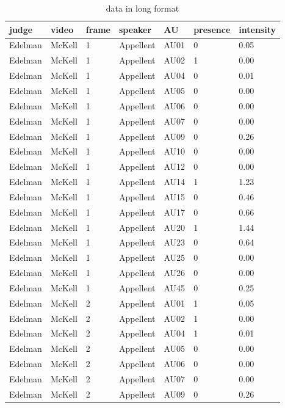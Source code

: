 \documentclass{monashthesis}
\begin{document}
\begin{table}[ht]
\begin{center}
\caption{\label{tab:long} data in long format}
\begin{tabular}{lllllll}
\toprule
judge & video & frame & speaker & AU & presence & intensity \\
\midrule
Edelman & McKell & 1 & Appellent & AU01 & 0 & 0.05 \\
Edelman & McKell & 1 & Appellent & AU02 & 1 & 0.00 \\
Edelman & McKell & 1 & Appellent & AU04 & 0 & 0.01 \\
Edelman & McKell & 1 & Appellent & AU05 & 0 & 0.00 \\
Edelman & McKell & 1 & Appellent & AU06 & 0 & 0.00 \\
Edelman & McKell & 1 & Appellent & AU07 & 0 & 0.00 \\
Edelman & McKell & 1 & Appellent & AU09 & 0 & 0.26 \\
Edelman & McKell & 1 & Appellent & AU10 & 0 & 0.00 \\
Edelman & McKell & 1 & Appellent & AU12 & 0 & 0.00 \\
Edelman & McKell & 1 & Appellent & AU14 & 1 & 1.23 \\
Edelman & McKell & 1 & Appellent & AU15 & 0 & 0.46 \\
Edelman & McKell & 1 & Appellent & AU17 & 0 & 0.66 \\
Edelman & McKell & 1 & Appellent & AU20 & 1 & 1.44 \\
Edelman & McKell & 1 & Appellent & AU23 & 0 & 0.64 \\
Edelman & McKell & 1 & Appellent & AU25 & 0 & 0.00 \\
Edelman & McKell & 1 & Appellent & AU26 & 0 & 0.00 \\
Edelman & McKell & 1 & Appellent & AU45 & 0 & 0.25 \\
Edelman & McKell & 2 & Appellent & AU01 & 1 & 0.05 \\
Edelman & McKell & 2 & Appellent & AU02 & 1 & 0.00 \\
Edelman & McKell & 2 & Appellent & AU04 & 1 & 0.01 \\
Edelman & McKell & 2 & Appellent & AU05 & 0 & 0.00 \\
Edelman & McKell & 2 & Appellent & AU06 & 0 & 0.00 \\
Edelman & McKell & 2 & Appellent & AU07 & 0 & 0.00 \\
Edelman & McKell & 2 & Appellent & AU09 & 0 & 0.26 \\

\end{tabular}
\end{center}
\end{table}
\end{document}
